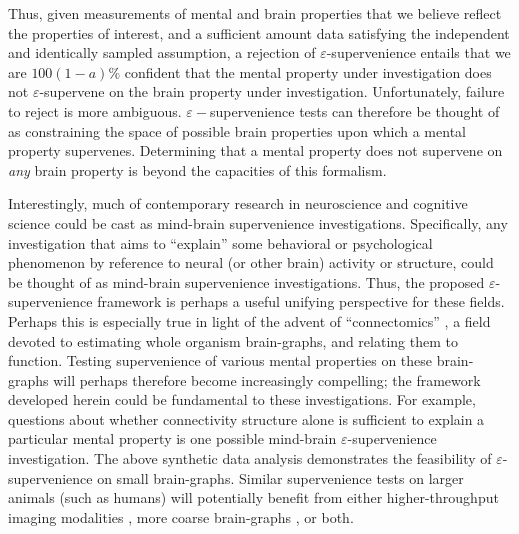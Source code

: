 \documentclass{article}
\newcommand{\eps}{\varepsilon}
\begin{document}
Thus, given measurements of mental and brain properties that we believe reflect the properties of interest, and a sufficient amount data satisfying the independent and identically sampled assumption, a rejection of $\eps$-supervenience entails that we are $100(1-a)\%$ confident that the mental property under investigation does not $\eps$-supervene on the brain property under investigation.  Unfortunately, failure to reject is more ambiguous. $\eps-$supervenience tests can therefore be thought of as constraining the space of possible brain properties upon which a mental property supervenes.  Determining that a mental property does not supervene on \emph{any} brain property is beyond the capacities of this formalism.

Interestingly, much of contemporary research in neuroscience and cognitive science could be cast as mind-brain supervenience investigations.  Specifically, any investigation that aims to ``explain'' some behavioral or psychological phenomenon by reference to neural (or other brain) activity or structure, could be thought of as mind-brain supervenience investigations.  Thus, the proposed $\eps$-supervenience framework is perhaps a useful unifying perspective for these fields.  Perhaps this is especially true in light of the advent of ``connectomics'' \cite{SpornsKotter05,Hagmann05}, a field devoted to estimating whole organism brain-graphs, and relating them to function.  Testing supervenience of various mental properties on these brain-graphs will perhaps therefore become increasingly compelling; the framework developed herein could be fundamental to these investigations.  
For example, questions about whether connectivity structure alone is sufficient to explain a particular mental property is one possible mind-brain $\eps$-supervenience investigation.  The above synthetic data analysis demonstrates the feasibility of $\eps$-supervenience on small brain-graphs.
Similar supervenience tests on larger animals (such as humans) will potentially benefit from either higher-throughput imaging modalities \cite{HayworthLichtman06, Bock2011}, more coarse brain-graphs \cite{PalmAmunts10,Johansen-Berg2009}, or both.
\end{document}
